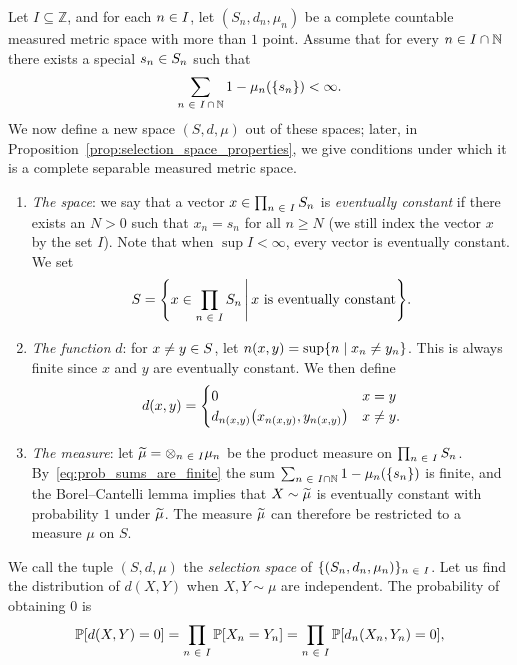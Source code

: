 \documentclass[AHL,Unicode]{cedram}
\newcommand*\n{\mathbb{N}}
\newcommand*\z{\mathbb{Z}}
\newcommand*\p{\mathbb{P}}
\newcommand*\tensor{\otimes}
\newcommand*\indexx[2]{n\left(#1,#2\right)}
\newcommand*\intersect{\cap}
\let\originalleft\left
\let\originalright\right
\renewcommand{\left}{\mathopen{}\mathclose\bgroup\originalleft}
\renewcommand{\right}{\aftergroup\egroup\originalright}
\let\oldin\in
\renewcommand{\in}{\mathchoice{\oldin}{\oldin}{\,\oldin\,}{\,\oldin\,}}
\let\oldtilde\tilde
\renewcommand*{\tilde}[1]{\mathchoice{\widetilde{#1}}{\widetilde{#1}}{\oldtilde{#1}}{\oldtilde{#1}}}
\begin{document}
Let $I\subseteq\z$, and for each $n\in I$, let $(S_{n},d_{n},\mu_{n})$ be a complete countable measured metric space with more than $1$ point. Assume that for every $n\in I\intersect\n$ there exists a special $s_{n}\in S_{n}$ such that
\begin{equation}\label{eq:prob_sums_are_finite}
\sum_{n\in I\,\intersect\,\n}1-\mu_{n}\left(\left\{ s_{n}\right\} \right)<\infty.
\end{equation}
We now define a new space $(S,d,\mu)$ out of these spaces; later, in Proposition~\ref{prop:selection_space_properties}, we give conditions under which it is a complete separable measured metric space.
\begin{enumerate}
\item \emph{The space}: we say that a vector $x\in\prod_{n\in I}S_{n}$ is \emph{eventually constant} if there exists an $N>0$ such that $x_{n}=s_{n}$ for all $n\geq N$ (we still index the vector $x$ by the set $I$). Note that when $\sup I<\infty$, every vector is eventually constant. We set
\[
S=\left\{ x\in\prod_{n\in I}S_{n}\,\middle| \,x\text{ is eventually constant}\right\}.
\]
\item \emph{The function }$d$: for $x\neq y\in S$, let $\indexx xy=\sup\{ n\mid x_{n}\neq y_{n}\} $. This is always finite since $x$ and $y$ are eventually constant. We then define
\[
d\left(x,y\right)=
\begin{cases}
0 & x=y\\
d_{\indexx xy}\left(x_{\indexx xy},y_{\indexx xy}\right) & x\neq y.
\end{cases}
\]
\item \emph{The measure}: let $\tilde{\mu}=\tensor_{n\in I}\mu_{n}$ be the product measure on $\prod_{n\in I}S_{n}$. By~\eqref{eq:prob_sums_are_finite} the sum $\sum_{n\in I\intersect\n}1-\mu_{n}(\{ s_{n}\} )$ is finite, and the Borel--Cantelli lemma implies that $X\sim\tilde{\mu}$ is eventually constant with probability $1$ under $\tilde{\mu}$. The measure $\tilde{\mu}$ can therefore be restricted to a measure $\mu$ on $S$.
\end{enumerate}
We call the tuple $(S,d,\mu)$ the \emph{selection space} of $\{ (S_{n},d_{n},\mu_{n})\} _{n\in I}$. Let us find the distribution of $d(X,Y)$ when $X,Y\sim\mu$ are independent. The probability of obtaining $0$ is
\begin{equation}\label{eq:prob_of_0}
\p\left[d\left(X,Y\right)=0\right]=\prod_{n\in I}\p\left[X_{n}=Y_{n}\right]=\prod_{n\in I}\p\left[d_{n}\left(X_{n},Y_{n}\right)=0\right],
\end{equation}
\end{document}
